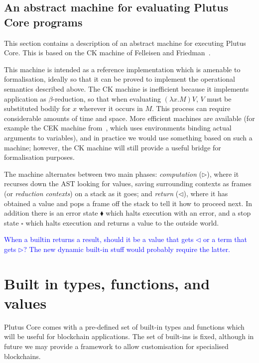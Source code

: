 \documentclass[a4paper]{article}
\newcommand{\blue}[1]{\textcolor{blue}{#1}}
\begin{document}


\subsection{An abstract machine for evaluating Plutus Core programs}
This section contains a description of an abstract machine for
executing Plutus Core.  This is based on the CK machine of Felleisen
and Friedman~\cite{Felleisen-CK-CEK}. 

This machine is intended as a reference implementation which is
amenable to formalisation, ideally so that it can be proved to
implement the operational semantics described above.  The CK machine
is inefficient because it implements application as $\beta$-reduction,
so that when evaluating $(\lambda x.M)V$, $V$ must be substituted
bodily for $x$ wherever it occurs in $M$.  This process can require
considerable amounts of time and space.  More efficient machines are
available (for example the CEK machine from~\cite{Felleisen-CK-CEK},
which uses environments binding actual arguments to variables), and in
practice we would use something based on such a machine; however, the
CK machine will still provide a useful bridge for formalisation
purposes.



\noindent The machine alternates between two main phases: \textit{computation}
($\triangleright$), where it recurses down the AST looking for values,
saving surrounding contexts as frames (or \textit{reduction contexts})
on a stack as it goes; and \textit{return} ($\triangleleft$), where it
has obtained a value and pops a frame off the stack to tell it how to
proceed next.  In addition there is an error state $\blacklozenge$
which halts execution with an error, and a stop state $\square$ which
halts execution and returns a value to the outside world.

\blue{When a builtin returns a result, should it be a value
  that gets $\triangleleft$ or a term that gets $\triangleright$?  The 
  new dynamic built-in stuff would probably require the latter.} 

\section{Built in types, functions, and values}
\label{sec:builtins}
Plutus Core comes with a pre-defined set of built-in types and
functions which will be useful for blockchain applications.  The set
of built-ins is fixed, although in future we may provide a framework
to allow customisation for specialised blockchains.
\end{document}
